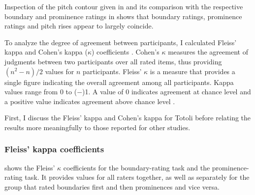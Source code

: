 Inspection of the pitch contour given in   and its comparison with the respective boundary and prominence ratings in  	 shows that boundary ratings, prominence ratings and pitch rises appear to largely coincide. 





To analyze the degree of agreement between participants, I calculated Fleiss’ kappa and Cohen’s kappa ($\kappa$) coefficients  \citep{Fleiss_1971, Cohen_1960}.  Cohen's $\kappa$ measures the agreement of judgments between two participants over all rated items, thus providing $(n^2-n)/2$ values for $n$ participants. Fleiss’ $\kappa$ is a measure that provides a single figure indicating the overall agreement among all participants. Kappa values range from 0 to ($-$)1. A value of 0 indicates agreement at chance level and a positive value indicates agreement above chance level \citep[83]{statitstics_dict}. 



First, I discuss the Fleiss’ kappa and Cohen’s kappa for Totoli before relating the results more meaningfully to those reported for other studies.


\subsubsection{Fleiss' kappa coefficients}\label{sec:fleiss-kappa-coefficients-and-z-normalized-scores}



  shows the Fleiss' $\kappa$ coefficients for the boundary-rating task and the prominence-rating task. It provides values for all raters together, as well as separately for the group that rated boundaries first and then prominences and vice versa.



